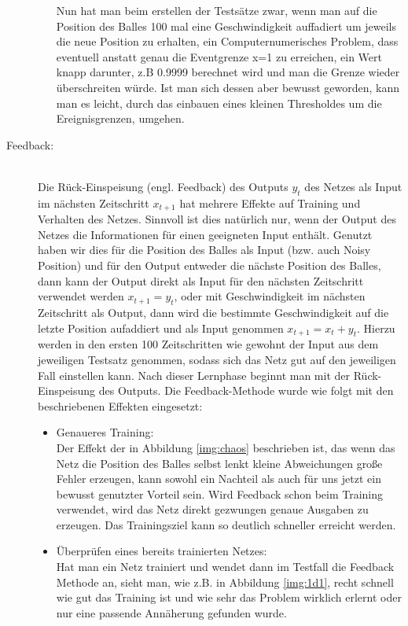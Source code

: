 \begin{description}
\begin{itemize}
		Nun hat man beim erstellen der Testsätze zwar, wenn man auf die Position des Balles 100 mal eine Geschwindigkeit auffadiert um jeweils die neue Position zu erhalten, ein Computernumerisches Problem, dass eventuell anstatt genau die Eventgrenze x=1 zu erreichen, ein Wert knapp darunter, z.B 0.9999 berechnet wird und man die Grenze wieder überschreiten würde. Ist man sich dessen aber bewusst geworden, kann man es leicht, durch das einbauen eines kleinen Thresholdes um die Ereignisgrenzen, umgehen. 
	\end{itemize}
	\item[Feedback:]\hfill \\
	Die Rück-Einspeisung (engl. Feedback) des Outputs $ y_{t} $ des Netzes als Input im nächsten Zeitschritt $ x_{t+1} $ hat mehrere Effekte auf Training und Verhalten des Netzes. Sinnvoll ist dies natürlich nur, wenn der Output des Netzes die Informationen für einen geeigneten Input enthält. Genutzt haben wir dies für die Position des Balles als Input (bzw. auch Noisy Position) und für den Output entweder die nächste Position des Balles, dann kann der Output direkt als Input für den nächsten Zeitschritt verwendet werden $ x_{t+1} = y_{t} $, oder mit Geschwindigkeit im nächsten Zeitschritt als Output, dann wird die bestimmte Geschwindigkeit auf die letzte Position aufaddiert und als Input genommen  $ x_{t+1} = x_{t}+y_{t} $. Hierzu werden in den ersten 100 Zeitschritten wie gewohnt der Input aus dem jeweiligen Testsatz genommen, sodass sich das Netz gut auf den jeweiligen Fall einstellen kann. Nach dieser Lernphase beginnt man mit der Rück-Einspeisung des Outputs. Die Feedback-Methode wurde wie folgt mit den beschriebenen Effekten eingesetzt: \hfill \\
	\begin{itemize}
		\item Genaueres Training: \hfill \\
		 Der Effekt der in Abbildung \ref{img:chaos} beschrieben ist, das wenn das Netz die Position des Balles selbst lenkt kleine Abweichungen große Fehler erzeugen, kann sowohl ein Nachteil als auch für uns jetzt ein bewusst genutzter Vorteil sein. Wird Feedback schon beim Training verwendet, wird das Netz direkt gezwungen genaue Ausgaben zu erzeugen. Das Trainingsziel kann so deutlich schneller erreicht werden. 
		\item Überprüfen eines bereits trainierten Netzes: \hfill \\
		 Hat man ein Netz trainiert und wendet dann im Testfall die Feedback Methode an, sieht man, wie z.B. in Abbildung \ref{img:1d1}, recht schnell wie gut das Training ist und wie sehr das Problem wirklich erlernt oder nur eine passende Annäherung gefunden wurde. 

\end{itemize}
\end{description}
